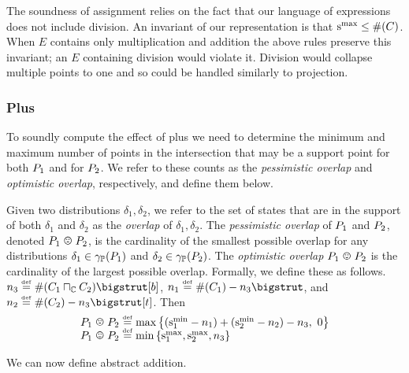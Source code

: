 The soundness of assignment relies on the fact that our
language of expressions does not include division.  An invariant of
our representation is that $\mathrm{s}^\mathrm{max}_{} \leq \#(C)$.  
When $E$ contains only multiplication and addition the
above rules preserve this invariant; an $E$ containing division would
violate it. 
Division would collapse multiple points to one and so could be handled
similarly to projection.

\subsubsection{Plus}

To soundly compute the effect of plus we need to determine the minimum
and maximum number 
of points in the intersection that may be a support point for both
$P_{1}$ and for $P_{2}$.  We refer to these counts as the
\emph{pessimistic overlap} and \emph{optimistic overlap},
respectively, and define them below.

\begin{definition}
\label{def:abs-overlap}
  Given two distributions $\delta_1,\delta_2$, we refer to the set of
  states that are in the support of both $\delta_1$ and $\delta_2$ as
  the \emph{overlap} of $\delta_1,\delta_2$.  The \emph{pessimistic
    overlap} of $P_{1}$ and $P_{2}$, denoted $\pessoverlap{\ppa}{\ppb}$,
  is the cardinality of the smallest possible overlap for any distributions
  $\delta_1 \in \gamma_{\mathbb{P}}(P_{1})$ and $\delta_2 \in \gamma_{\mathbb{P}}(P_{2})$.  The
  \emph{optimistic overlap} $\optoverlap{\ppa}{\ppb}$ is the cardinality of the largest possible
  overlap.  Formally, we define these as follows.  $n_3 \defeq \psize{\pa
    \pmeet \pb} \bigstrut[b]$, $n_1 \defeq \psize{\pa} - n_3 \bigstrut$, and
  $n_2 \defeq \psize{\pb} - n_3 \bigstrut[t]$.  Then
\[\begin{array}{l}
\pessoverlap{\ppa}{\ppb} \defeq \maxparen{(\smin{1} - n_1) + (\smin{2} - n_2) -
n_3,\ 0} \\
\optoverlap{\ppa}{\ppb} \defeq \minparen{\smax{1}, \smax{2}, n_3} \\
\end{array}\]
\end{definition}
We can now define abstract addition.


